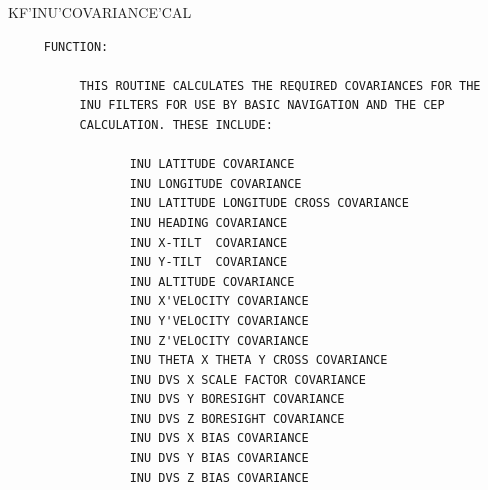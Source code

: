 \begin{frame}
KF'INU'COVARIANCE'CAL
\begin{verbatim}
     FUNCTION:

          THIS ROUTINE CALCULATES THE REQUIRED COVARIANCES FOR THE
          INU FILTERS FOR USE BY BASIC NAVIGATION AND THE CEP
          CALCULATION. THESE INCLUDE:

                 INU LATITUDE COVARIANCE
                 INU LONGITUDE COVARIANCE
                 INU LATITUDE LONGITUDE CROSS COVARIANCE
                 INU HEADING COVARIANCE
                 INU X-TILT  COVARIANCE
                 INU Y-TILT  COVARIANCE
                 INU ALTITUDE COVARIANCE
                 INU X'VELOCITY COVARIANCE
                 INU Y'VELOCITY COVARIANCE
                 INU Z'VELOCITY COVARIANCE
                 INU THETA X THETA Y CROSS COVARIANCE
                 INU DVS X SCALE FACTOR COVARIANCE
                 INU DVS Y BORESIGHT COVARIANCE
                 INU DVS Z BORESIGHT COVARIANCE
                 INU DVS X BIAS COVARIANCE
                 INU DVS Y BIAS COVARIANCE
                 INU DVS Z BIAS COVARIANCE


\end{verbatim}
\end{frame}
